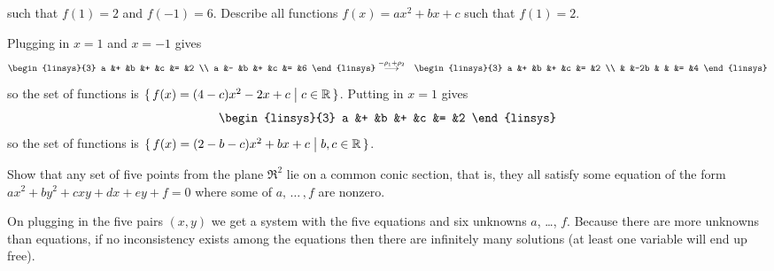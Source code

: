 \begin{exercises}
\begin{exparts}
        such that \( f(1)=2 \) and \( f(-1)=6 \).
      \partsitem Describe all functions \( f(x)=ax^2+bx+c \) 
        such that \( f(1)=2 \).
    \end{exparts}
    \begin{answer}
      \begin{exparts}
        \partsitem Plugging in \( x=1 \) and \( x=-1 \) gives
          \begin{eqnarray*}
            \begin{linsys}{3}
              a  &+  &b   &+  &c  &=  &2  \\
              a  &-  &b   &+  &c  &=  &6  
            \end{linsys}
            &\grstep{-\rho_1+\rho_2}
            &\begin{linsys}{3}
              a  &+  &b   &+  &c  &=  &2  \\
                 &   &-2b &   &   &=  &4  
              \end{linsys}
          \end{eqnarray*}
          so the set of functions is
          \( \mbox{$\{\,f(x)=(4-c)x^2-2x+c\bigm| c\in\mathbb{R}\,\}$} \).
        \partsitem Putting in \( x=1 \) gives
          \begin{equation*}
            \begin{linsys}{3}
              a  &+  &b   &+  &c  &=  &2  
            \end{linsys}
          \end{equation*}
          so the set of functions is
          \( \mbox{$\{\,f(x)=(2-b-c)x^2+bx+c\bigm| b,c\in\mathbb{R}\,\}$} \).
      \end{exparts}  
    \end{answer}
  \item Show that any set of five points from the plane \( \Re^2 \) lie on a
    common conic section, that is, they all satisfy some equation of the
    form \( ax^2+by^2+cxy+dx+ey+f=0 \) where some of \( a,\,\ldots\,,f \)
    are nonzero.
    \begin{answer}
      On plugging in the five pairs $(x,y)$ we get a system with the
      five equations and six unknowns $a$, \ldots, $f$.
      Because there are more unknowns than equations, if no inconsistency
      exists among the equations then there are infinitely many solutions
      (at least one variable will end up free).


\end{answer}
\end{exercises}
